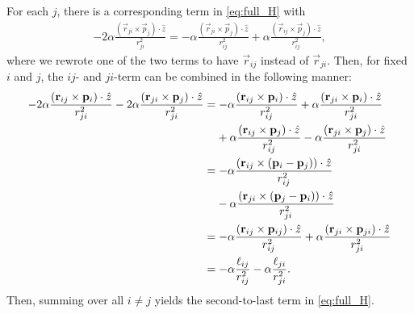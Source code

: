 For each $j$, there is a corresponding term in \cref{eq:full_H} with
\begin{align}
    -2\alpha \frac{(\vec{r}_{ji}\times\vec{p}_j)\cdot\hat{z}}{r_{ji}^2} = -\alpha \frac{(\vec{r}_{ji}\times\vec{p}_j)\cdot\hat{z}}{r_{ij}^2} + \alpha \frac{(\vec{r}_{ij}\times\vec{p}_j)\cdot\hat{z}}{r_{ij}^2},
\end{align}
where we rewrote one of the two terms to have $\vec{r}_{ij}$ instead of $\vec{r}_{ji}$. Then, for fixed $i$ and $j$, the $ij$- and $ji$-term can be combined in the following manner:
\begin{align}
    \begin{split}
    -2\alpha \frac{(\vec{r}_{ij}\times\vec{p}_i)\cdot\hat{z}}{r_{ji}^2} -2\alpha \frac{(\vec{r}_{ji}\times\vec{p}_j)\cdot\hat{z}}{r_{ji}^2} 
        &= -\alpha \frac{(\vec{r}_{ij}\times\vec{p}_i)\cdot\hat{z}}{r_{ij}^2} + \alpha \frac{(\vec{r}_{ji}\times\vec{p}_i)\cdot\hat{z}}{r_{ji}^2} \\ 
        &\hspace{.375cm} +\alpha \frac{(\vec{r}_{ij}\times\vec{p}_j)\cdot\hat{z}}{r_{ij}^2} - \alpha \frac{(\vec{r}_{ji}\times\vec{p}_j)\cdot\hat{z}}{r_{ji}^2} \\
        &= -\alpha \frac{(\vec{r}_{ij}\times\left( \vec{p}_{i} - \vec{p}_{j} \right))\cdot\hat{z}}{r_{ij}^2} \\
        &\hspace{.375cm} -\alpha \frac{(\vec{r}_{ji}\times\left( \vec{p}_{j} - \vec{p}_{i} \right))\cdot\hat{z}}{r_{ji}^2} \\
        &= -\alpha \frac{(\vec{r}_{ij}\times\vec{p}_{ij})\cdot\hat{z}}{r_{ij}^2} + \alpha \frac{(\vec{r}_{ji}\times\vec{p}_{ji})\cdot\hat{z}}{r_{ji}^2} \\
        &= -\alpha \frac{\vec{\ell}_{ij}}{r_{ij}^2} - \alpha \frac{\vec{\ell}_{ji}}{r_{ji}^2}.
    \end{split}
\end{align}
Then, summing over all $i\neq j$ yields the second-to-last term in \cref{eq:full_H}.